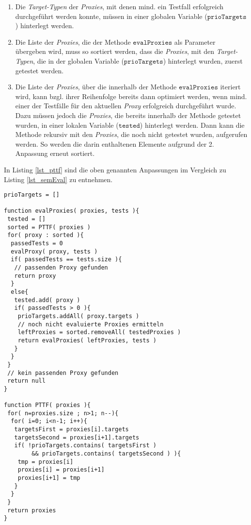 \begin{enumerate}
\item 
Die \emph{Target-Typen} der \emph{Proxies}, mit denen mind. ein Testfall erfolgreich durchgeführt werden konnte, müssen in einer globalen Variable ($\texttt{prioTargets}$) hinterlegt werden.

\item 
Die Liste der \emph{Proxies}, die der Methode $\texttt{evalProxies}$ als Parameter übergeben wird, muss so sortiert werden, dass die \emph{Proxies}, mit den \emph{Target-Typen}, die in der globalen Variable ($\texttt{prioTargets}$) hinterlegt wurden, zuerst getestet werden. 

\item 
Die Liste der \emph{Proxies}, über die innerhalb der Methode $\texttt{evalProxies}$ iteriert wird, kann bzgl. ihrer Reihenfolge bereits dann optimiert werden, wenn mind. einer der Testfälle für den aktuellen \emph{Proxy} erfolgreich durchgeführt wurde. Dazu müssen jedoch die \emph{Proxies}, die bereits innerhalb der Methode getestet wurden, in einer lokalen Variable ($\texttt{tested}$) hinterlegt werden. Dann kann die Methode rekursiv mit den \emph{Proxies}, die noch nicht getestet wurden, aufgerufen werden. So werden die darin enthaltenen Elemente aufgrund der 2. Anpassung erneut sortiert.
\end{enumerate}  
In Listing \ref{lst_pttf} sind die oben genannten Anpassungen im Vergleich zu Listing \ref{lst_semEval} zu entnehmen. 
\begin{lstlisting}[style = pseudo, caption = Semantische Evaluation mit Heuristik PTTF, captionpos = b, label = lst_pttf]
prioTargets = []

function evalProxies( proxies, tests ){
 tested = []
 sorted = PTTF( proxies )
 for( proxy : sorted ){
  passedTests = 0
  evalProxy( proxy, tests )
  if( passedTests == tests.size ){
   // passenden Proxy gefunden
   return proxy
  }
  else{
   tested.add( proxy )
   if( passedTests > 0 ){
    prioTargets.addAll( proxy.targets )
    // noch nicht evaluierte Proxies ermitteln
    leftProxies = sorted.removeAll( testedProxies )
    return evalProxies( leftProxies, tests )
   }
  }
 }
 // kein passenden Proxy gefunden
 return null
}

function PTTF( proxies ){
 for( n=proxies.size ; n>1; n--){
  for( i=0; i<n-1; i++){
   targetsFirst = proxies[i].targets
   targetsSecond = proxies[i+1].targets			
   if( !prioTargets.contains( targetsFirst ) 
        && prioTargets.contains( targetsSecond ) ){
    tmp = proxies[i]
    proxies[i] = proxies[i+1]
    proxies[i+1] = tmp
   }
  }
 }
 return proxies	
}
\end{lstlisting}

